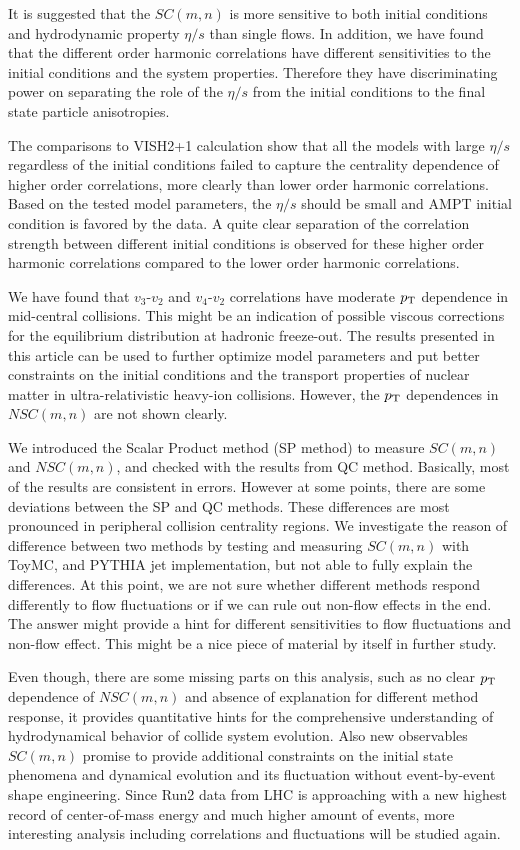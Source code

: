  It is suggested that the $SC(m,n)$ is more sensitive to both initial conditions and hydrodynamic property $\eta/s$ than single flows.  In addition, we have found that the different order harmonic correlations have different sensitivities to the initial conditions and the system properties. Therefore they have discriminating power on separating the role of the $\eta/s$  from the initial conditions to the final state particle anisotropies.

The comparisons to VISH2+1 calculation show that all the models with large $\eta/s$ regardless of the initial conditions failed to capture the centrality dependence of higher order correlations, more clearly than lower order harmonic correlations. 
Based on the tested model parameters, the $\eta/s$ should be small and AMPT initial condition is favored by the data. A quite clear separation of the correlation strength between different initial conditions is observed for these higher order harmonic correlations compared to the lower order harmonic correlations.

We have found that $v_3$-$v_2$ and $v_4$-$v_2$ correlations have moderate $p_{\rm T}$ dependence in mid-central collisions. This might be an indication of possible viscous corrections for the equilibrium distribution at hadronic freeze-out.
The results presented in this article can be used to further optimize model parameters and put better constraints on the initial conditions and the transport properties of nuclear matter in ultra-relativistic heavy-ion collisions. However, the $p_{\rm{T}}$ dependences in $NSC(m,n)$ are not shown clearly.

We introduced the Scalar Product method (SP method) to measure $SC(m,n)$ and  $NSC(m,n)$, and checked with the results from QC method. Basically, most of the results are consistent in errors. However at some points, there are some deviations between the SP and QC methods. These differences are most pronounced in peripheral collision centrality regions. We investigate the reason of difference between two methods by testing and measuring $SC(m,n)$ with ToyMC, and PYTHIA jet implementation, but not able to fully explain the differences. 
At this point, we are not sure whether different methods respond differently to flow fluctuations or if we can rule out non-flow effects in the end. The answer might provide a hint for different sensitivities to flow fluctuations and non-flow effect. This might be a nice piece of material by itself in further study.

Even though, there are some missing parts on this analysis, such as no clear $p_{\rm{T}}$ dependence of  $NSC(m,n)$ and absence of explanation for different method response, it provides quantitative hints for the comprehensive understanding of hydrodynamical behavior of collide system evolution. Also new observables $SC(m,n)$ promise to provide additional constraints on the initial state phenomena and dynamical evolution and its fluctuation without event-by-event shape engineering. Since Run2 data from LHC is approaching with a new highest record of center-of-mass energy and much higher amount of events, more interesting analysis including correlations and fluctuations will be studied again.

